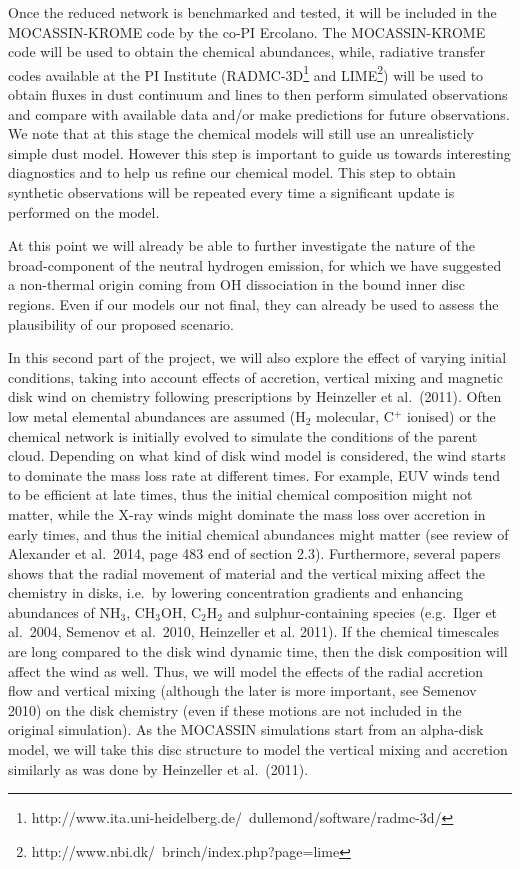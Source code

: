 \documentclass[10pt,fleqn,twoside]{article}
\begin{document}
 Once the reduced network is benchmarked and tested, it will be included in the MOCASSIN-KROME code by the co-PI Ercolano. The MOCASSIN-KROME code will be used to obtain the chemical abundances, while, radiative transfer codes available at the PI Institute (RADMC-3D\footnote{http://www.ita.uni-heidelberg.de/~dullemond/software/radmc-3d/} and LIME\footnote{http://www.nbi.dk/~brinch/index.php?page=lime}) will be used to obtain fluxes in dust continuum and lines to then perform simulated observations and compare with available data and/or make predictions for future observations. We note that at this stage the chemical models will still use an unrealisticly simple dust model. However this step is important to guide us towards interesting diagnostics and to help us refine our chemical model. This step to obtain synthetic observations will be repeated every time a significant update is performed on the model. 

At this point we will already be able to further investigate the nature of the broad-component of the neutral hydrogen emission, for which we have suggested a non-thermal origin coming from OH dissociation in the bound inner disc regions. Even if our models our not final, they can already be used to assess the plausibility of our proposed scenario.

In this second part of the project, we will also explore the effect of
varying initial conditions, taking into account effects of accretion,
vertical mixing and magnetic disk wind on chemistry following
prescriptions by Heinzeller et al.\ (2011). Often low metal elemental
abundances are assumed (H$_2$ molecular, C$^+$ ionised) or the
chemical network is initially evolved to simulate the conditions of
the parent cloud.  Depending on what kind of disk wind model is
considered, the wind starts to dominate the mass loss rate at
different times. For example, EUV winds tend to be efficient at late
times, thus the initial chemical composition might not matter, while
the X-ray winds might dominate the mass loss over accretion in early
times, and thus the initial chemical abundances might matter (see
review of Alexander et al.\ 2014, page 483 end of section
2.3). Furthermore, several papers shows that the radial movement of
material and the vertical mixing affect the chemistry in disks,
i.e.\ by lowering concentration gradients and enhancing abundances of
NH$_3$, CH$_3$OH, C$_2$H$_2$ and sulphur-containing species
(e.g.\ Ilger et al.\ 2004, Semenov et al.\ 2010, Heinzeller et
al. 2011). If the chemical timescales are long compared to the disk
wind dynamic time, then the disk composition will affect the wind as
well. Thus, we will model the effects of the radial accretion flow and
vertical mixing (although the later is more important, see Semenov
2010) on the disk chemistry (even if these motions are not included in
the original simulation). As the MOCASSIN simulations start from an
alpha-disk model, we will take this disc structure to model the
vertical mixing and accretion similarly as was done by Heinzeller et
al.\ (2011). 
\end{document}
